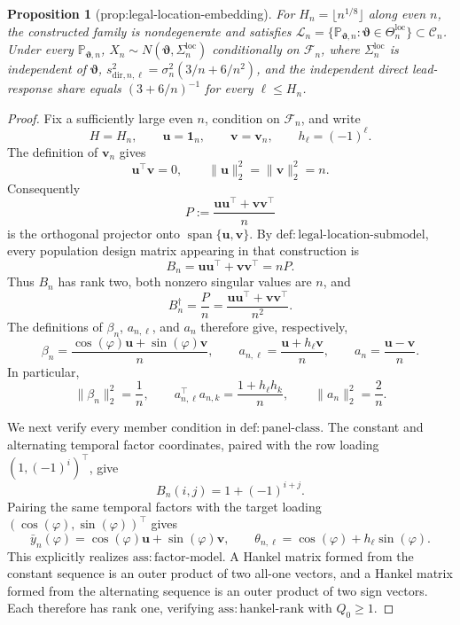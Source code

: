 \documentclass{article}
\newtheorem{proposition}{Proposition}
\begin{document}
\begin{proposition}[prop:legal-location-embedding]\label{prop:legal-location-embedding}
For \(H_n=\lfloor n^{1/8}\rfloor\) along even \(n\), the constructed family is nondegenerate and satisfies \(\mathcal L_n=\{\mathbb P_{\boldsymbol\vartheta,n}:\boldsymbol\vartheta\in\Theta_n^{\mathrm{loc}}\}\subset\mathcal C_n\). Under every \(\mathbb P_{\boldsymbol\vartheta,n}\), \(X_n\sim N(\boldsymbol\vartheta,\Sigma_n^{\mathrm{loc}})\) conditionally on \(\mathcal F_n\), where \(\Sigma_n^{\mathrm{loc}}\) is independent of \(\boldsymbol\vartheta\), \(s_{\mathrm{dir},n,\ell}^2=\sigma_n^2(3/n+6/n^2)\), and the independent direct lead-response share equals \((3+6/n)^{-1}\) for every \(\ell\le H_n\).
\end{proposition}
\begin{proof}
Fix a sufficiently large even \(n\), condition on \(\mathcal F_n\), and write
\[
 H=H_n,\qquad \boldsymbol u=\boldsymbol 1_n,\qquad
 \boldsymbol v=\boldsymbol v_n,\qquad h_\ell=(-1)^\ell .
\]
The definition of \(\boldsymbol v_n\) gives
\[
 \boldsymbol u^{\top}\boldsymbol v=0,
 \qquad \|\boldsymbol u\|_2^2=\|\boldsymbol v\|_2^2=n.
\]
Consequently
\[
 P:=\frac{\boldsymbol u\boldsymbol u^{\top}
              +\boldsymbol v\boldsymbol v^{\top}}{n}
\]
is the orthogonal projector onto
\(\operatorname{span}\{\boldsymbol u,\boldsymbol v\}\).  By
\(\mathrm{def{:}legal\mbox{-}location\mbox{-}submodel}\), every population
design matrix appearing in that construction is
\[
 B_n=\boldsymbol u\boldsymbol u^{\top}
       +\boldsymbol v\boldsymbol v^{\top}=nP.
\]
Thus \(B_n\) has rank two, both nonzero singular values are \(n\), and
\[
 B_n^\dagger=\frac{P}{n}
 =\frac{\boldsymbol u\boldsymbol u^{\top}
          +\boldsymbol v\boldsymbol v^{\top}}{n^2}.
\]
The definitions of \(\beta_n\), \(a_{n,\ell}\), and \(a_n\) therefore give,
respectively,
\[
 \beta_n=\frac{\cos(\varphi)\boldsymbol u
                     +\sin(\varphi)\boldsymbol v}{n},
 \qquad
 a_{n,\ell}=\frac{\boldsymbol u+h_\ell\boldsymbol v}{n},
 \qquad
 a_n=\frac{\boldsymbol u-\boldsymbol v}{n}.
\]
In particular,
\[
 \|\beta_n\|_2^2=\frac1n,
 \qquad
 a_{n,\ell}^{\top}a_{n,k}=\frac{1+h_\ell h_k}{n},
 \qquad
 \|a_n\|_2^2=\frac2n.                                      \tag{1}
\]

We next verify every member condition in
\(\mathrm{def{:}panel\mbox{-}class}\).  The constant and alternating temporal
factor coordinates, paired with the row loading \((1,(-1)^i)^{\top}\), give
\[
 B_n(i,j)=1+(-1)^{i+j}.
\]
Pairing the same temporal factors with the target loading
\((\cos(\varphi),\sin(\varphi))^{\top}\) gives
\[
 \bar y_n(\varphi)=\cos(\varphi)\boldsymbol u
                    +\sin(\varphi)\boldsymbol v,
 \qquad
 \theta_{n,\ell}=\cos(\varphi)+h_\ell\sin(\varphi).          \tag{2}
\]
This explicitly realizes \(\mathrm{ass{:}factor\mbox{-}model}\).  A Hankel
matrix formed from the constant sequence is an outer product of two all-one
vectors, and a Hankel matrix formed from the alternating sequence is an outer
product of two sign vectors.  Each therefore has rank one, verifying
\(\mathrm{ass{:}hankel\mbox{-}rank}\) with \(Q_0\geq1\).


\end{proof}
\end{document}
